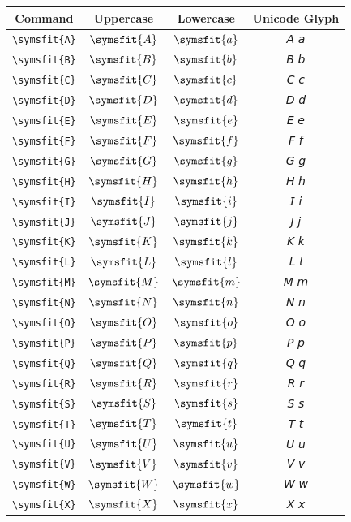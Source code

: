 \documentclass[12pt,a4paper]{article}
\begin{document}
\begin{longtable}{|c|c|c|c|}
\hline
\textbf{Command} & \textbf{Uppercase} & \textbf{Lowercase} & \textbf{Unicode Glyph} \\
\hline
\verb|\symsfit{A}| & $\symsfit{A}$ & $\symsfit{a}$ & 𝘈 𝘢 \\
\verb|\symsfit{B}| & $\symsfit{B}$ & $\symsfit{b}$ & 𝘉 𝘣 \\
\verb|\symsfit{C}| & $\symsfit{C}$ & $\symsfit{c}$ & 𝘊 𝘤 \\
\verb|\symsfit{D}| & $\symsfit{D}$ & $\symsfit{d}$ & 𝘋 𝘥 \\
\verb|\symsfit{E}| & $\symsfit{E}$ & $\symsfit{e}$ & 𝘌 𝘦 \\
\verb|\symsfit{F}| & $\symsfit{F}$ & $\symsfit{f}$ & 𝘍 𝘧 \\
\verb|\symsfit{G}| & $\symsfit{G}$ & $\symsfit{g}$ & 𝘎 𝘨 \\
\verb|\symsfit{H}| & $\symsfit{H}$ & $\symsfit{h}$ & 𝘏 𝘩 \\
\verb|\symsfit{I}| & $\symsfit{I}$ & $\symsfit{i}$ & 𝘐 𝘪 \\
\verb|\symsfit{J}| & $\symsfit{J}$ & $\symsfit{j}$ & 𝘑 𝘫 \\
\verb|\symsfit{K}| & $\symsfit{K}$ & $\symsfit{k}$ & 𝘒 𝘬 \\
\verb|\symsfit{L}| & $\symsfit{L}$ & $\symsfit{l}$ & 𝘓 𝘭 \\
\verb|\symsfit{M}| & $\symsfit{M}$ & $\symsfit{m}$ & 𝘔 𝘮 \\
\verb|\symsfit{N}| & $\symsfit{N}$ & $\symsfit{n}$ & 𝘕 𝘯 \\
\verb|\symsfit{O}| & $\symsfit{O}$ & $\symsfit{o}$ & 𝘖 𝘰 \\
\verb|\symsfit{P}| & $\symsfit{P}$ & $\symsfit{p}$ & 𝘗 𝘱 \\
\verb|\symsfit{Q}| & $\symsfit{Q}$ & $\symsfit{q}$ & 𝘘 𝘲 \\
\verb|\symsfit{R}| & $\symsfit{R}$ & $\symsfit{r}$ & 𝘙 𝘳 \\
\verb|\symsfit{S}| & $\symsfit{S}$ & $\symsfit{s}$ & 𝘚 𝘴 \\
\verb|\symsfit{T}| & $\symsfit{T}$ & $\symsfit{t}$ & 𝘛 𝘵 \\
\verb|\symsfit{U}| & $\symsfit{U}$ & $\symsfit{u}$ & 𝘜 𝘶 \\
\verb|\symsfit{V}| & $\symsfit{V}$ & $\symsfit{v}$ & 𝘝 𝘷 \\
\verb|\symsfit{W}| & $\symsfit{W}$ & $\symsfit{w}$ & 𝘞 𝘸 \\
\verb|\symsfit{X}| & $\symsfit{X}$ & $\symsfit{x}$ & 𝘟 𝘹 \\

\end{longtable}
\end{document}
